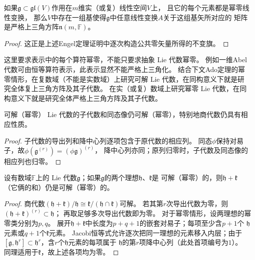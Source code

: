 \begin{theorem}
    如果$\mathfrak{g}\subset\mathfrak{gl}(V)$作用在$m$维实（或复）线性空间$V$上，
    且它的每个元素都是幂零线性变换，
    那么$V$中存在一组基使得$\mathfrak{g}$中任意线性变换$A$关于这组基矢所对应的
    矩阵是严格上三角方阵$\mathfrak{n}(m,\mathbb{F})$。
\end{theorem}

\begin{proof}
这正是上述Engel定理证明中逐次构造公共零矢量所得的不变旗。
\end{proof}

这里要求表示中的每个算符幂零，不能只要求抽象 Lie 代数幂零。
例如一维Abel代数可由恒等算符表示，此表示显然不能严格上三角化。
结合下文Ado定理的幂零情形，在复数域（不能是实数域）上研究可解 Lie 代数，在同构意义下就是研究全体复上三角方阵及其子代数。
在实（或复）数域上研究幂零 Lie 代数，在同构意义下就是研究全体严格上三角方阵及其子代数。

\begin{proposition}
可解（幂零） Lie 代数的子代数和同态像仍可解（幂零），特别地商代数仍具有相应性质。
\end{proposition}
\begin{proof}
子代数的导出列和降中心列逐项包含于原代数的相应列。
同态$\phi$保持对易子，故$\phi(\mathfrak g^{(r)})=(\phi\mathfrak g)^{(r)}$，
降中心列亦同；原列归零时，子代数及同态像的相应列也归零。
\end{proof}

\begin{proposition}\label{chlg:thm_isnosn}
    设有数域$\mathbb{F}$上的 Lie 代数$\mathfrak{g}$；如果$\mathfrak{g}$的两个理想$\mathfrak{h}$、$\mathfrak{k}$是
    可解（幂零）的，则$\mathfrak{h}+\mathfrak{k}$（它俩的和）仍是可解（幂零）的。
\end{proposition}
\begin{proof}
商代数$(\mathfrak h+\mathfrak k)/\mathfrak h\cong\mathfrak k/(\mathfrak h\cap\mathfrak k)$可解。
若其第$r$次导出代数为零，则$(\mathfrak h+\mathfrak k)^{(r)}\subset\mathfrak h$；
再取足够多次导出代数即为零。
对于幂零情形，设两理想的幂零类分别为$p,q$。
展开$\mathfrak h+\mathfrak k$中长度为$p+q+1$的嵌套对易子；每项至少含$p+1$个
$\mathfrak h$元素或$q+1$个$\mathfrak k$元素。
Jacobi恒等式允许逐次把同一理想的元素移入内层；由于
$[\mathfrak g,\mathfrak h^r]\subset\mathfrak h^r$，含$r$个$\mathfrak h$元素的每项属于
$\mathfrak h$的第$r$项降中心列（此处首项编号为$1$）。
同理适用于$\mathfrak k$，故上述各项均为零。
\end{proof}


